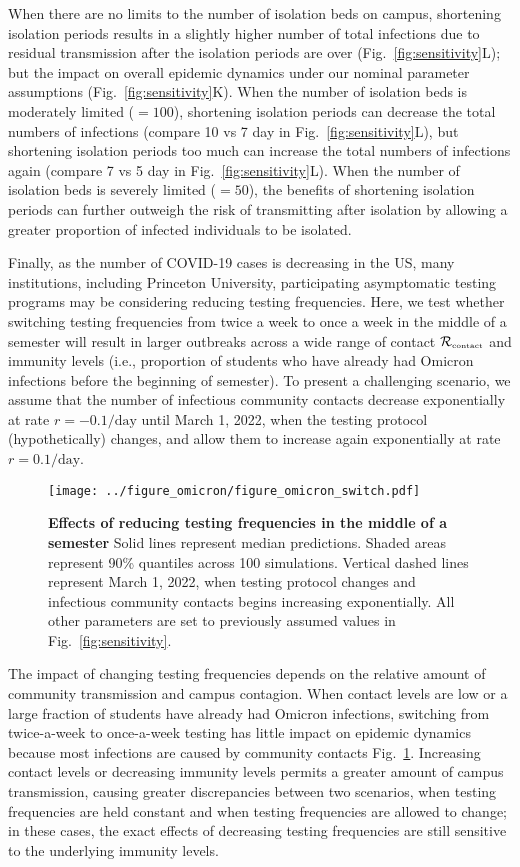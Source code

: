 \documentclass[12pt]{article}
\newcommand{\fref}[1]{Fig.~\ref{fig:#1}}
\newcommand{\Rx}[1]{\ensuremath{{\mathcal R}_{#1}}}
\newcommand{\Rc}{\Rx{\textrm{\tiny{contact}}}}
\begin{document}
When there are no limits to the number of isolation beds on campus, shortening isolation periods results in a slightly higher number of total infections due to residual transmission after the isolation periods are over (\fref{sensitivity}L); but the impact on overall epidemic dynamics under our nominal parameter assumptions (\fref{sensitivity}K).
When the number of isolation beds is moderately limited ($=100$), shortening isolation periods can decrease the total numbers of infections (compare 10 vs 7 day in \fref{sensitivity}L), but shortening isolation periods too much can increase the total numbers of infections again (compare 7 vs 5 day in \fref{sensitivity}L).
When the number of isolation beds is severely limited ($=50$), the benefits of shortening isolation periods can further outweigh the risk of transmitting after isolation by allowing a greater proportion of infected individuals to be isolated.

Finally, as the number of COVID-19 cases is decreasing in the US, many institutions, including Princeton University, participating asymptomatic testing programs may be considering reducing testing frequencies.
Here, we test whether switching testing frequencies from twice a week to once a week in the middle of a semester will result in larger outbreaks across a wide range of contact $\Rc$ and immunity levels (i.e., proportion of students who have already had Omicron infections before the beginning of semester).
To present a challenging scenario, we assume that the number of infectious community contacts decrease exponentially at rate $r=-0.1/\textrm{day}$ until March 1, 2022, when the testing protocol (hypothetically) changes, and allow them to increase again exponentially at rate $r=0.1/\textrm{day}$.

\begin{figure}[!th]
\texttt{[image: ../figure\_omicron/figure\_omicron\_switch.pdf]}
\caption{
\textbf{Effects of reducing testing frequencies in the middle of a semester}
Solid lines represent median predictions.
Shaded areas represent 90\% quantiles across 100 simulations.
Vertical dashed lines represent March 1, 2022, when testing protocol changes and infectious community contacts begins increasing exponentially.
All other parameters are set to previously assumed values in \fref{sensitivity}.
\label{fig:switch}
}
\end{figure}

The impact of changing testing frequencies depends on the relative amount of community transmission and campus contagion.
When contact levels are low or a large fraction of students have already had Omicron infections, switching from twice-a-week to once-a-week testing has little impact on epidemic dynamics because most infections are caused by community contacts \fref{switch}.
Increasing contact levels or decreasing immunity levels permits a greater amount of campus transmission, causing greater discrepancies between two scenarios, when testing frequencies are held constant and when testing frequencies are allowed to change;
in these cases, the exact effects of decreasing testing frequencies are still sensitive to the underlying immunity levels.
\end{document}
